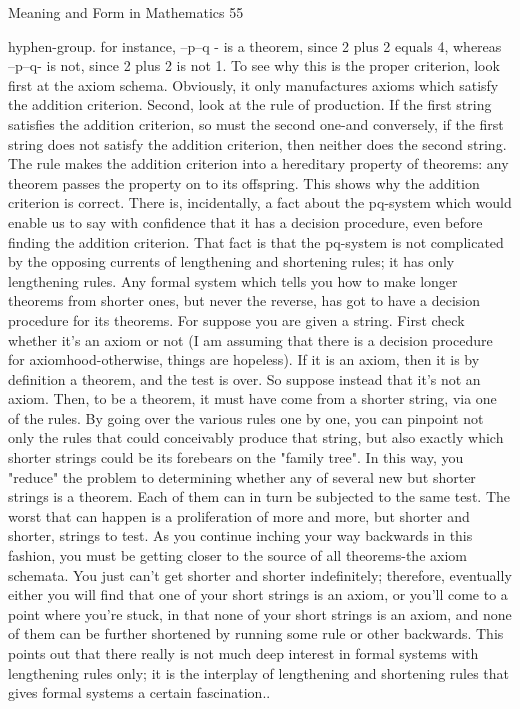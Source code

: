 Meaning and Form in Mathematics                                                          55

hyphen-group. for instance, --p--q - is a theorem, since 2 plus 2 equals 4, whereas --p--q-
is not, since 2 plus 2 is not 1. To see why this is the proper criterion, look first at the
axiom schema. Obviously, it only manufactures axioms which satisfy the addition
criterion. Second, look at the rule of production. If the first string satisfies the addition
criterion, so must the second one-and conversely, if the first string does not satisfy the
addition criterion, then neither does the second string. The rule makes the addition
criterion into a hereditary property of theorems: any theorem passes the property on to its
offspring. This shows why the addition criterion is correct.
        There is, incidentally, a fact about the pq-system which would enable us to say
with confidence that it has a decision procedure, even before finding the addition
criterion. That fact is that the pq-system is not complicated by the opposing currents of
lengthening and shortening rules; it has only lengthening rules. Any formal system which
tells you how to make longer theorems from shorter ones, but never the reverse, has got
to have a decision procedure for its theorems. For suppose you are given a string. First
check whether it's an axiom or not (I am assuming that there is a decision procedure for
axiomhood-otherwise, things are hopeless). If it is an axiom, then it is by definition a
theorem, and the test is over. So suppose instead that it's not an axiom. Then, to be a
theorem, it must have come from a shorter string, via one of the rules. By going over the
various rules one by one, you can pinpoint not only the rules that could conceivably
produce that string, but also exactly which shorter strings could be its forebears on the
"family tree". In this way, you "reduce" the problem to determining whether any of
several new but shorter strings is a theorem. Each of them can in turn be subjected to the
same test. The worst that can happen is a proliferation of more and more, but shorter and
shorter, strings to test. As you continue inching your way backwards in this fashion, you
must be getting closer to the source of all theorems-the axiom schemata. You just can't
get shorter and shorter indefinitely; therefore, eventually either you will find that one of
your short strings is an axiom, or you'll come to a point where you're stuck, in that none
of your short strings is an axiom, and none of them can be further shortened by running
some rule or other backwards. This points out that there really is not much deep interest
in formal systems with lengthening rules only; it is the interplay of lengthening and
shortening rules that gives formal systems a certain fascination..

